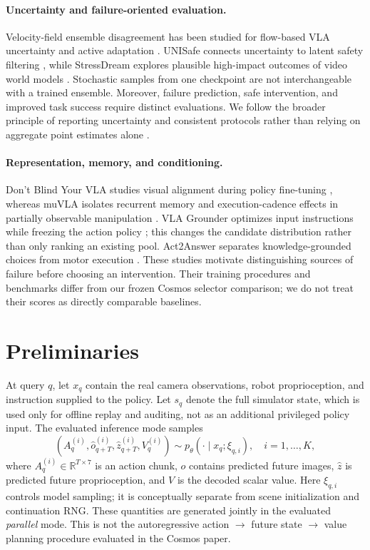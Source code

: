 \documentclass{article}
\newcommand{\R}{\mathbb{R}}
\begin{document}
\paragraph{Uncertainty and failure-oriented evaluation.}
Velocity-field ensemble disagreement has been studied for flow-based VLA
uncertainty and active adaptation \citep{flow_uq}. UNISafe connects uncertainty
to latent safety filtering \citep{unisafe}, while StressDream explores
plausible high-impact outcomes of video world models \citep{stressdream}.
Stochastic samples from one checkpoint are not interchangeable with a trained
ensemble. Moreover, failure prediction, safe intervention, and improved task
success require distinct evaluations. We follow the broader principle of
reporting uncertainty and consistent protocols rather than relying on
aggregate point estimates alone \citep{rliable}.

\paragraph{Representation, memory, and conditioning.}
Don't Blind Your VLA studies visual alignment during policy fine-tuning
\citep{kachaev_blind_vla}, whereas muVLA isolates recurrent memory and
execution-cadence effects in partially observable manipulation
\citep{kachaev_mu_vla}. VLA Grounder optimizes input instructions while
freezing the action policy \citep{kachaev_vla_grounder}; this changes the
candidate distribution rather than only ranking an existing pool.
Act2Answer separates knowledge-grounded choices from motor execution
\citep{kachaev_act2answer}. These studies motivate distinguishing sources
of failure before choosing an intervention. Their training procedures and
benchmarks differ from our frozen Cosmos selector comparison; we do not
treat their scores as directly comparable baselines.

\section{Preliminaries}
\label{sec:preliminaries}
At query $q$, let $x_q$ contain the real camera observations, robot
proprioception, and instruction supplied to the policy. Let $s_q$ denote the
full simulator state, which is used only for offline replay and auditing, not
as an additional privileged policy input. The evaluated inference mode samples
\begin{equation}
 (A_q^{(i)},\widehat{o}_{q+T}^{(i)},\widehat{z}_{q+T}^{(i)},V_q^{(i)})
 \sim p_\theta(\cdot\mid x_q;\xi_{q,i}),\quad i=1,\ldots,K,
 \label{eq:candidates}
\end{equation}
where $A_q^{(i)}\in\R^{T\times7}$ is an action chunk, $\widehat{o}$ contains
predicted future images, $\widehat{z}$ is predicted future proprioception,
and $V$ is the decoded scalar value. Here $\xi_{q,i}$ controls model sampling;
it is conceptually separate from scene initialization and continuation RNG.
These quantities are generated jointly in the evaluated \emph{parallel}
mode. This is not the autoregressive action $\to$ future state $\to$ value
planning procedure evaluated in the Cosmos paper.
\end{document}

